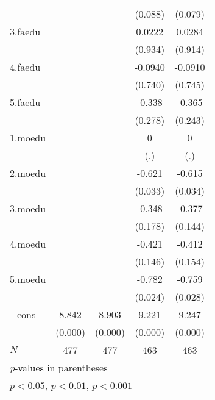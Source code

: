 {\begin{tabular}{l*{4}{c}}
            &                     &                     &     (0.088)         &     (0.079)         \\
[1em]
3.faedu     &                     &                     &      0.0222         &      0.0284         \\
            &                     &                     &     (0.934)         &     (0.914)         \\
[1em]
4.faedu     &                     &                     &     -0.0940         &     -0.0910         \\
            &                     &                     &     (0.740)         &     (0.745)         \\
[1em]
5.faedu     &                     &                     &      -0.338         &      -0.365         \\
            &                     &                     &     (0.278)         &     (0.243)         \\
[1em]
1.moedu     &                     &                     &           0         &           0         \\
            &                     &                     &         (.)         &         (.)         \\
[1em]
2.moedu     &                     &                     &      -0.621\sym{*}  &      -0.615\sym{*}  \\
            &                     &                     &     (0.033)         &     (0.034)         \\
[1em]
3.moedu     &                     &                     &      -0.348         &      -0.377         \\
            &                     &                     &     (0.178)         &     (0.144)         \\
[1em]
4.moedu     &                     &                     &      -0.421         &      -0.412         \\
            &                     &                     &     (0.146)         &     (0.154)         \\
[1em]
5.moedu     &                     &                     &      -0.782\sym{*}  &      -0.759\sym{*}  \\
            &                     &                     &     (0.024)         &     (0.028)         \\
[1em]
\_cons      &       8.842\sym{***}&       8.903\sym{***}&       9.221\sym{***}&       9.247\sym{***}\\
            &     (0.000)         &     (0.000)         &     (0.000)         &     (0.000)         \\
\hline
\(N\)       &         477         &         477         &         463         &         463         \\
\hline\hline
\multicolumn{5}{l}{\footnotesize \textit{p}-values in parentheses}\\
\multicolumn{5}{l}{\footnotesize \sym{*} \(p<0.05\), \sym{**} \(p<0.01\), \sym{***} \(p<0.001\)}\\
\end{tabular}
}
